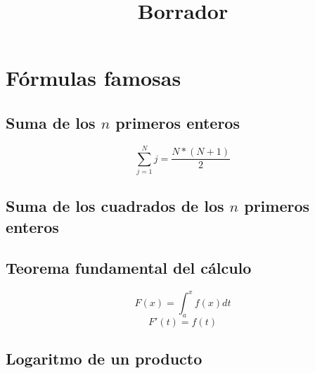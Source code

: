 \documentclass{article}
\author{}
\date{}
\title{Borrador}
\begin{document}
\maketitle


\begin{abstract}

\end{abstract}

\section{F\'ormulas famosas}

\subsection{Suma de los $n$ primeros enteros}
\[\sum_{j=1}^{N}j=\frac{N*(N+1)}{2}\]

\subsection{Suma de los cuadrados de los $n$ primeros enteros}


\subsection{Teorema fundamental del cálculo}

\[F(x) = \int_a^xf(x)dt\]
\[F'(t)=f(t)\]

\subsection{Logaritmo de un producto}
\end{document}
